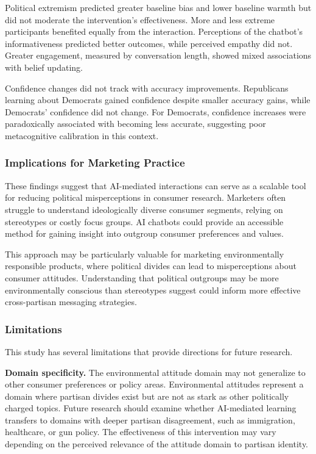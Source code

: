 \documentclass[
  11pt,
  oneside]{article}
\begin{document}
Political extremism predicted greater baseline bias and lower baseline
warmth but did not moderate the intervention's effectiveness. More and
less extreme participants benefited equally from the interaction.
Perceptions of the chatbot's informativeness predicted better outcomes,
while perceived empathy did not. Greater engagement, measured by
conversation length, showed mixed associations with belief updating.

Confidence changes did not track with accuracy improvements. Republicans
learning about Democrats gained confidence despite smaller accuracy
gains, while Democrats' confidence did not change. For Democrats,
confidence increases were paradoxically associated with becoming less
accurate, suggesting poor metacognitive calibration in this context.

\subsubsection{Implications for Marketing
Practice}\label{implications-for-marketing-practice}

These findings suggest that AI-mediated interactions can serve as a
scalable tool for reducing political misperceptions in consumer
research. Marketers often struggle to understand ideologically diverse
consumer segments, relying on stereotypes or costly focus groups. AI
chatbots could provide an accessible method for gaining insight into
outgroup consumer preferences and values.

This approach may be particularly valuable for marketing environmentally
responsible products, where political divides can lead to misperceptions
about consumer attitudes. Understanding that political outgroups may be
more environmentally conscious than stereotypes suggest could inform
more effective cross-partisan messaging strategies.

\subsubsection{Limitations}\label{limitations}

This study has several limitations that provide directions for future
research.

\textbf{Domain specificity.} The environmental attitude domain may not
generalize to other consumer preferences or policy areas. Environmental
attitudes represent a domain where partisan divides exist but are not as
stark as other politically charged topics. Future research should
examine whether AI-mediated learning transfers to domains with deeper
partisan disagreement, such as immigration, healthcare, or gun policy.
The effectiveness of this intervention may vary depending on the
perceived relevance of the attitude domain to partisan identity.
\end{document}
